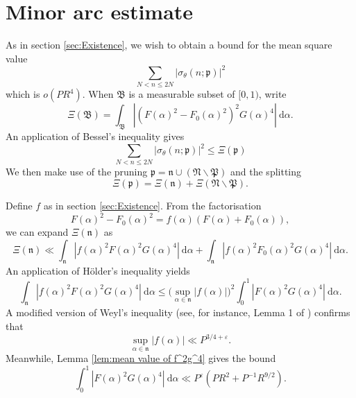 \documentclass[12pt,english,reqno]{amsart}
\theoremstyle{definition}
\theoremstyle{remark}
\numberwithin{equation}{section}
\numberwithin{equation}{section}
\numberwithin{figure}{section}
\theoremstyle{plain}
\theoremstyle{plain}
\theoremstyle{plain}
\theoremstyle{plain}
\numberwithin{equation}{section}
\numberwithin{thm}{section}
\begin{document}
\section{Minor arc estimate}
As in section \ref{sec:Existence}, we wish to obtain a bound for
the mean square value
\[
\sum_{N<n\leq2N}|\sigma_{\theta}(n;\mathfrak{p})|^{2}\]
which is $o(PR^{4})$. When $\mathfrak{B}$ is a measurable subset
of $[0,1)$, write
\begin{equation}
\Xi(\mathfrak{B})=\int_{\mathfrak{B}}|(F(\alpha)^{2}-F_{0}(\alpha)^{2})^{2}G(\alpha)^{4}|\:\mathrm{d}\alpha.\label{eq:Xi(B)}\end{equation}
An application of Bessel's inequality gives
\begin{equation}
\sum_{N<n\leq2N}|\sigma_{\theta}(n;\mathfrak{p})|^{2}\leq\Xi(\mathfrak{p})\label{eq:Bessel for asymptotic}\end{equation}
We then make use of the pruning $\mathfrak{p}=\mathfrak{n}\cup(\mathfrak{N}\backslash\mathfrak{P})$
and the splitting
\begin{equation}
\Xi(\mathfrak{p})=\Xi(\mathfrak{n})+\Xi(\mathfrak{N}\backslash\mathfrak{P}).\label{eq:pruning for asymptotic}\end{equation}
\par Define $f$ as in section \ref{sec:Existence}. From the factorisation
\[
F(\alpha)^{2}-F_{0}(\alpha)^{2}=f(\alpha)(F(\alpha)+F_{0}(\alpha)),\]
we can expand $\Xi(\mathfrak{n})$ as
\begin{equation}
\Xi(\mathfrak{n})\ll\int_{\mathfrak{n}}|f(\alpha)^{2}F(\alpha)^{2}G(\alpha)^{4}|\:\mathrm{d}\alpha+\int_{\mathfrak{n}}|f(\alpha)^{2}F_{0}(\alpha)^{2}G(\alpha)^{4}|\:\mathrm{d}\alpha.\label{eq:expanding Xi(n)}\end{equation}
An application of H\"{o}lder's inequality yields
\begin{equation}
\int_{\mathfrak{n}}|f(\alpha)^{2}F(\alpha)^{2}G(\alpha)^{4}|\:\mathrm{d}\alpha\leq\Big(\sup_{\alpha\in\mathfrak{n}}|f(\alpha)|\Big)^{2}\int_{0}^{1}|F(\alpha)^{2}G(\alpha)^{4}|\:\mathrm{d}\alpha.\label{eq:splitting up Xi(n)}\end{equation}
A modified version of Weyl's inequality (see, for instance, Lemma
1 of \cite{vaughan1986}) confirms that
\begin{equation}
\sup_{\alpha\in\mathfrak{n}}|f(\alpha)|\ll P^{3/4+\varepsilon}.\label{eq:Weyl's ineq. on f over n}\end{equation}
Meanwhile, Lemma \ref{lem:mean value of f^2g^4} gives the bound
\begin{equation}
\int_{0}^{1}|F(\alpha)^{2}G(\alpha)^{4}|\:\mathrm{d}\alpha\ll P^{\varepsilon}(PR^{2}+P^{-1}R^{9/2}).\label{eq:mean value for F^2G^4}\end{equation}
\end{document}

